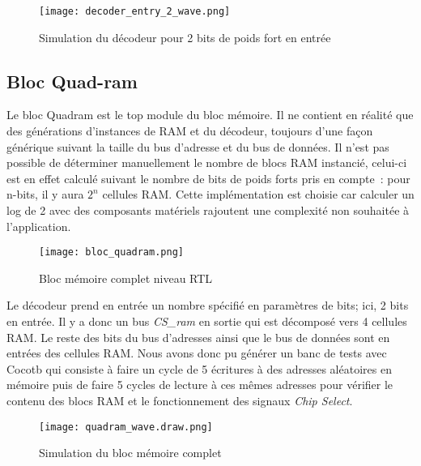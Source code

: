 \begin{figure}[h]
	\centering
	\texttt{[image: decoder\_entry\_2\_wave.png]}
	\caption{Simulation du décodeur pour 2 bits de poids fort en entrée}
	\label{fig:wave_bloc_decoder}
\end{figure}

\newpage

\subsection{Bloc Quad-ram}

\indent Le bloc Quadram est le top module du bloc mémoire.
Il ne contient en réalité que des générations d'instances de RAM et du décodeur, toujours d'une façon générique suivant la taille du bus d'adresse et du bus de données.
Il n'est pas possible de déterminer manuellement le nombre de blocs RAM instancié, celui-ci est en effet calculé suivant le nombre de bits de poids forts pris en compte : pour n-bits, il y aura $ 2^{n} $ cellules RAM. Cette implémentation est choisie car calculer un log de 2 avec des composants matériels rajoutent une complexité non souhaitée à l'application.

\begin{figure}[h]
	\centering
	\texttt{[image: bloc\_quadram.png]}
	\caption{Bloc mémoire complet niveau RTL}
	\label{fig:synth_bloc_quadram}
\end{figure}

\indent Le décodeur prend en entrée un nombre spécifié en paramètres de bits; ici, 2 bits en entrée. 
Il y a donc un bus \textit{CS\_ram} en sortie qui est décomposé vers 4 cellules RAM. 
Le reste des bits du bus d'adresses ainsi que le bus de données sont en entrées des cellules RAM.
Nous avons donc pu générer un banc de tests avec Cocotb qui consiste à faire un cycle de 5 écritures à des adresses aléatoires en mémoire puis de faire 5 cycles de lecture à ces mêmes adresses pour vérifier le contenu des blocs RAM et le fonctionnement des signaux \textit{Chip Select}.

\newpage

\begin{figure}[h]
	\centering
	\texttt{[image: quadram\_wave.draw.png]}
	\caption{Simulation du bloc mémoire complet}
	\label{fig:wave_bloc_quadram}
\end{figure}

